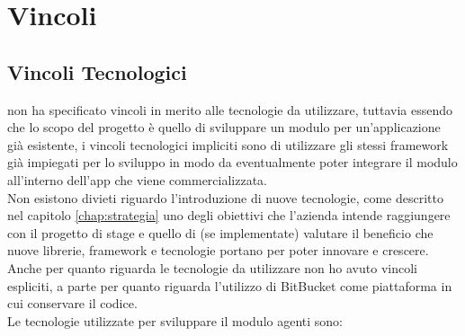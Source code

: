 \section{Vincoli}
\subsection{Vincoli Tecnologici}
{\company} non ha specificato vincoli in merito alle tecnologie da utilizzare, tuttavia essendo che lo scopo del progetto è quello di 
sviluppare un modulo per un'applicazione già esistente, i vincoli tecnologici impliciti sono di utilizzare gli stessi framework già 
impiegati per lo sviluppo in modo da eventualmente poter integrare il modulo all'interno dell'app che viene commercializzata.\\
Non esistono divieti riguardo l'introduzione di nuove tecnologie, come descritto nel capitolo \ref{chap:strategia} uno degli obiettivi 
che l'azienda intende raggiungere con il progetto di stage e quello di (se implementate) valutare il beneficio che nuove librerie, framework 
e tecnologie portano per poter innovare e crescere.\\
Anche per quanto riguarda le tecnologie da utilizzare non ho avuto vincoli espliciti, a parte per quanto riguarda l'utilizzo di BitBucket 
come piattaforma in cui conservare il codice.\\
Le tecnologie utilizzate per sviluppare il modulo agenti sono:
